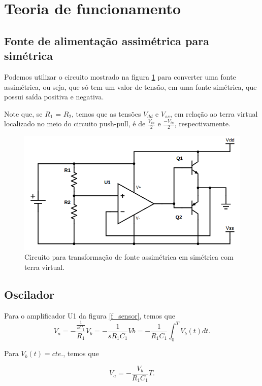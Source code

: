 \newpage
\section{Teoria de funcionamento}

\subsection{Fonte de alimentação assimétrica para simétrica}
Podemos utilizar o circuito mostrado na figura \ref{f_fonte} para converter uma fonte assimétrica, ou seja, que só tem um valor de tensão, em uma fonte simétrica, que possui saída positiva e negativa.

Note que, se $R_1$ = $R_2$, temos que as tensões $V_{dd}$ e $V_{ss}$, em relação ao terra virtual localizado no meio do circuito push-pull, é de $\frac{V_{in}}{2}$ e $\frac{-V_{in}}{2}$, respectivamente.

\begin{figure}[H]
    \centering
    \includegraphics[scale=0.5]{img/fonte.png}
    \caption{Circuito para transformação de fonte assimétrica em simétrica com terra virtual.}
    \label{f_fonte}
\end{figure}

\subsection{Oscilador}
Para o amplificador U1 da figura \ref{f_sensor}, temos que 
\[
V_a = -\frac{\frac{1}{sC_1}}{R_1}V_b = -\frac{1}{sR_1C_1}Vb = -\frac{1}{R_1C_1} \int_{0}^{T}V_b(t)dt.
\]

Para $V_b(t) = cte.$, temos que 

\begin{equation}
V_a = -\frac{V_b}{R_1C_1}T.
\label{e_va}  
\end{equation}

